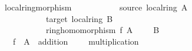 \documentclass[12pt]{scrartcl}
\begin{document}
\begin{isabelle}
\isamarkupfalse%
\ local{\isacharunderscore}{\kern0pt}ring{\isacharunderscore}{\kern0pt}morphism\ {\isacharequal}{\kern0pt}\isanewline
\ \ \ \ \ \ \ \ \ \ source{\isacharcolon}{\kern0pt}\ local{\isacharunderscore}{\kern0pt}ring\ A\ {\isachardoublequoteopen}{\isacharparenleft}{\kern0pt}{\isacharplus}{\kern0pt}{\isacharparenright}{\kern0pt}{\isachardoublequoteclose}\ {\isachardoublequoteopen}{\isacharparenleft}{\kern0pt}{\isasymcdot}{\isacharparenright}{\kern0pt}{\isachardoublequoteclose}\ {\isasymzero}\ {\isasymone}\ \isanewline
\ \ \ \ \ \ \ \ \ \ {\isacharplus}{\kern0pt}\ target{\isacharcolon}{\kern0pt}\ local{\isacharunderscore}{\kern0pt}ring\ B\ {\isachardoublequoteopen}{\isacharparenleft}{\kern0pt}{\isacharplus}{\kern0pt}{\isacharprime}{\kern0pt}{\isacharparenright}{\kern0pt}{\isachardoublequoteclose}\ {\isachardoublequoteopen}{\isacharparenleft}{\kern0pt}{\isasymcdot}{\isacharprime}{\kern0pt}{\isacharparenright}{\kern0pt}{\isachardoublequoteclose}\ {\isachardoublequoteopen}{\isasymzero}{\isacharprime}{\kern0pt}{\isachardoublequoteclose}\ {\isachardoublequoteopen}{\isasymone}{\isacharprime}{\kern0pt}{\isachardoublequoteclose}\isanewline
\ \ \ \ \ \ \ \ \ \ {\isacharplus}{\kern0pt}\ ring{\isacharunderscore}{\kern0pt}homomorphism\ f\ A\ {\isachardoublequoteopen}{\isacharparenleft}{\kern0pt}{\isacharplus}{\kern0pt}{\isacharparenright}{\kern0pt}{\isachardoublequoteclose}\ {\isachardoublequoteopen}{\isacharparenleft}{\kern0pt}{\isasymcdot}{\isacharparenright}{\kern0pt}{\isachardoublequoteclose}\ {\isachardoublequoteopen}{\isasymzero}{\isachardoublequoteclose}\ {\isachardoublequoteopen}{\isasymone}{\isachardoublequoteclose}\ B\ {\isachardoublequoteopen}{\isacharparenleft}{\kern0pt}{\isacharplus}{\kern0pt}{\isacharprime}{\kern0pt}{\isacharparenright}{\kern0pt}{\isachardoublequoteclose}\ {\isachardoublequoteopen}{\isacharparenleft}{\kern0pt}{\isasymcdot}{\isacharprime}{\kern0pt}{\isacharparenright}{\kern0pt}{\isachardoublequoteclose}\ {\isachardoublequoteopen}{\isasymzero}{\isacharprime}{\kern0pt}{\isachardoublequoteclose}\ {\isachardoublequoteopen}{\isasymone}{\isacharprime}{\kern0pt}{\isachardoublequoteclose}\isanewline
\ \ \ f\ \ A\ \ addition\ {\isacharparenleft}{\kern0pt}\ {\isachardoublequoteopen}{\isacharplus}{\kern0pt}{\isachardoublequoteclose}\ {}{}{\isacharparenright}{\kern0pt}\ \ multiplication\ {\isacharparenleft}{\kern0pt}\ {\isachardoublequoteopen}{\isasymcdot}{\isachardoublequoteclose}\ {}{}{\isacharparenright}{\kern0pt}\ \isanewline

\end{isabelle}
\end{document}
